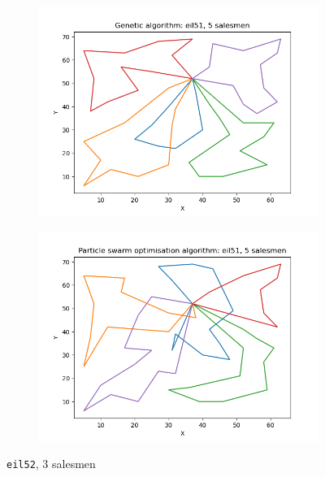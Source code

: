 \documentclass[conference]{IEEEtran}
\begin{document}
\begin{figure}[h]
    \centering
    \begin{subfigure}{.5\textwidth}
      \centering
      \includegraphics[width=\textwidth]{images/Genetic algorithm: eil51, 5 salesmen.png}
    \end{subfigure}%
    \begin{subfigure}{.5\textwidth}
      \centering
      \includegraphics[width=\textwidth]{images/Particle swarm optimisation algorithm: eil51, 5 salesmen.png}
    \end{subfigure}%
    \caption{\texttt{eil52}, 3 salesmen} \label{eil52, 5 salesmen}
\end{figure}
\end{document}
